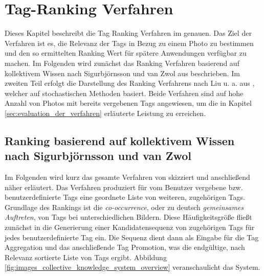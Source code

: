 \section{Tag-Ranking Verfahren} %
\label{sec:tag_ranking_verfahren}
Dieses Kapitel beschreibt die Tag Ranking Verfahren im genauen. Das Ziel der Verfahren ist es, die Relevanz der Tags in Bezug zu einem Photo zu bestimmen und den so ermittelten Ranking Wert für spätere Anwendungen verfügbar zu machen. Im Folgenden wird zunächst das Ranking Verfahren basierend auf kollektivem Wissen nach Sigurbjörnsson und van Zwol aus \cite{collectiveKnowledge} beschrieben. Im zweiten Teil erfolgt die Darstellung des Ranking Verfahrens nach Liu u. a. aus \cite{ranking}, welcher auf stochastischen Methoden basiert. Beide Verfahren sind auf hohe Anzahl von Photos mit bereits vergebenen Tags angewiesen, um die in Kapitel \ref{sec:evaluation_der_verfahren} erläuterte Leistung zu erreichen.

\subsection{Ranking basierend auf kollektivem Wissen nach Sigurbjörnsson und van Zwol} %
\label{sub:ranking_basierend_auf_kollektivem_wissen_nach_zwol}

Im Folgenden wird kurz das gesamte Verfahren von \cite{collectiveKnowledge} skizziert und anschließend näher erläutert. Das Verfahren produziert für vom Benutzer vergebene bzw. benutzerdefinierte Tags eine geordnete Liste von weiteren, zugehörigen Tags. Grundlage des Rankings ist die \emph{co-occurrence}, oder zu deutsch \emph{gemeinsames Auftreten}, von Tags bei unterschiedlichen Bildern. Diese Häufigkeitsgröße fließt zunächst in die Generierung einer Kandidatensequenz von zugehörigen Tags für jedes benutzerdefinierte Tag ein. Die Sequenz dient dann als Eingabe für die Tag Aggregation und das anschließende Tag Promotion, was die endgültige, nach Relevanz sortierte Liste von Tags ergibt. Abbildung \ref{fig:images_collective_knowledge_system_overview} veranschaulicht das System.

